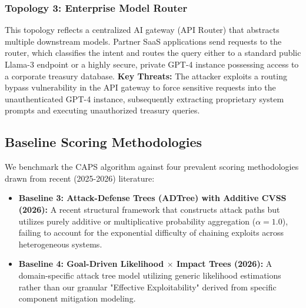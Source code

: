 \subsubsection{Topology 3: Enterprise Model Router}
This topology reflects a centralized AI gateway (API Router) that abstracts multiple downstream models. Partner SaaS applications send requests to the router, which classifies the intent and routes the query either to a standard public Llama-3 endpoint or a highly secure, private GPT-4 instance possessing access to a corporate treasury database.
\textbf{Key Threats:} The attacker exploits a routing bypass vulnerability in the API gateway to force sensitive requests into the unauthenticated GPT-4 instance, subsequently extracting proprietary system prompts and executing unauthorized treasury queries.

\subsection{Baseline Scoring Methodologies}
We benchmark the CAPS algorithm against four prevalent scoring methodologies drawn from recent (2025-2026) literature:

\begin{itemize}
    \item \textbf{Baseline 3: Attack-Defense Trees (ADTree) with Additive CVSS (2026):} A recent structural framework \cite{nagaraja2026llmbasedsystemsbreaksystemlevel} that constructs attack paths but utilizes purely additive or multiplicative probability aggregation ($\alpha = 1.0$), failing to account for the exponential difficulty of chaining exploits across heterogeneous systems.
    \item \textbf{Baseline 4: Goal-Driven Likelihood $\times$ Impact Trees (2026):} A domain-specific attack tree model \cite{goaldriven2026} utilizing generic likelihood estimations rather than our granular "Effective Exploitability" derived from specific component mitigation modeling.
\end{itemize}


